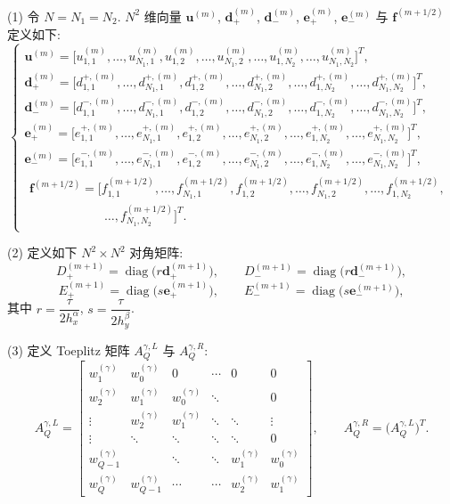 (1) 令 $N=N_{1}=N_{2}$. $N^{2}$ 维向量 $\mathbf{u}^{(m)}$, $\mathbf{d}_{+}^{(m)}$, $\mathbf{d}_{-}^{(m)}$, $\mathbf{e}_{+}^{(m)}$, $\mathbf{e}_{-}^{(m)}$ 与 $\mathbf{f}^{(m+1/2)}$ 定义如下:
\[
\left\{
\begin{array}{l}
\mathbf{u}^{(m)}=\bigl[u_{1,1}^{(m)},\ldots,u_{N_{1},1}^{(m)},u_{1,2}^{(m)},\ldots,u_{N_{1},2}^{(m)},\ldots,u_{1,N_{2}}^{(m)},\ldots,u_{N_{1},N_{2}}^{(m)}\bigr]^{T},\\[2mm]
\mathbf{d}_{+}^{(m)}=\bigl[d_{1,1}^{+,(m)},\ldots,d_{N_{1},1}^{+,(m)},d_{1,2}^{+,(m)},\ldots,d_{N_{1},2}^{+,(m)},\ldots,d_{1,N_{2}}^{+,(m)},\ldots,d_{N_{1},N_{2}}^{+,(m)}\bigr]^{T},\\[2mm]
\mathbf{d}_{-}^{(m)}=\bigl[d_{1,1}^{-,(m)},\ldots,d_{N_{1},1}^{-,(m)},d_{1,2}^{-,(m)},\ldots,d_{N_{1},2}^{-,(m)},\ldots,d_{1,N_{2}}^{-,(m)},\ldots,d_{N_{1},N_{2}}^{-,(m)}\bigr]^{T},\\[2mm]
\mathbf{e}_{+}^{(m)}=\bigl[e_{1,1}^{+,(m)},\ldots,e_{N_{1},1}^{+,(m)},e_{1,2}^{+,(m)},\ldots,e_{N_{1},2}^{+,(m)},\ldots,e_{1,N_{2}}^{+,(m)},\ldots,e_{N_{1},N_{2}}^{+,(m)}\bigr]^{T},\\[2mm]
\mathbf{e}_{-}^{(m)}=\bigl[e_{1,1}^{-,(m)},\ldots,e_{N_{1},1}^{-,(m)},e_{1,2}^{-,(m)},\ldots,e_{N_{1},2}^{-,(m)},\ldots,e_{1,N_{2}}^{-,(m)},\ldots,e_{N_{1},N_{2}}^{-,(m)}\bigr]^{T},\\[2mm]
\begin{array}{l}
\mathbf{f}^{(m+1/2)}=\bigl[f_{1,1}^{(m+1/2)},\ldots,f_{N_{1},1}^{(m+1/2)},f_{1,2}^{(m+1/2)},\ldots,f_{N_{1},2}^{(m+1/2)},\ldots,f_{1,N_{2}}^{(m+1/2)},\\
\qquad\qquad\qquad \ldots,f_{N_{1},N_{2}}^{(m+1/2)}\bigr]^{T}.
\end{array}
\end{array}
\right.
\]

(2) 定义如下 $N^{2}\times N^{2}$ 对角矩阵:
\[
  D_{+}^{(m+1)}=\operatorname{diag}\bigl(r\mathbf{d}_{+}^{(m+1)}\bigr),\qquad
  D_{-}^{(m+1)}=\operatorname{diag}\bigl(r\mathbf{d}_{-}^{(m+1)}\bigr),
\]
\[
  E_{+}^{(m+1)}=\operatorname{diag}\bigl(s\mathbf{e}_{+}^{(m+1)}\bigr),\qquad
  E_{-}^{(m+1)}=\operatorname{diag}\bigl(s\mathbf{e}_{-}^{(m+1)}\bigr),
\]
其中 $r=\dfrac{\tau}{2h_{x}^{\alpha}}$, $s=\dfrac{\tau}{2h_{y}^{\beta}}$.

(3) 定义 Toeplitz 矩阵 $A_{Q}^{\gamma,L}$ 与 $A_{Q}^{\gamma,R}$:
\[
  A_{Q}^{\gamma,L}=
  \begin{bmatrix}
    w_{1}^{(\gamma)} & w_{0}^{(\gamma)} & 0 & \cdots & 0 & 0\\
    w_{2}^{(\gamma)} & w_{1}^{(\gamma)} & w_{0}^{(\gamma)} & \ddots & & 0\\
    \vdots & w_{2}^{(\gamma)} & w_{1}^{(\gamma)} & \ddots & \ddots & \vdots\\
    \vdots & \ddots & \ddots & \ddots & \ddots & 0\\
    w_{Q-1}^{(\gamma)} & & \ddots & \ddots & w_{1}^{(\gamma)} & w_{0}^{(\gamma)}\\
    w_{Q}^{(\gamma)} & w_{Q-1}^{(\gamma)} & \cdots & \cdots & w_{2}^{(\gamma)} & w_{1}^{(\gamma)}
  \end{bmatrix},
  \qquad
  A_{Q}^{\gamma,R}=\bigl(A_{Q}^{\gamma,L}\bigr)^{T}.
\]

